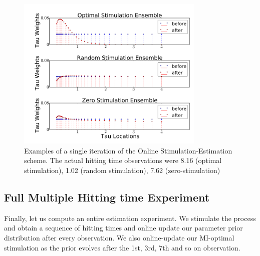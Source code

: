 \documentclass[12pt]{article}
\begin{document}
\begin{figure}[h]
\begin{center}  
\includegraphics[width=0.80\textwidth]
{Figs/HTOnlineEstimator/single_trial_example_weights.pdf} 
\caption[Effect of the First Observation on the Belief
Distribution]{Examples of a single iteration of the Online Stimulation-Estimation scheme.
The actual hitting time observations were 8.16 (optimal stimulation), 1.02
(random stimulation), 7.62 (zero-stimulation) }
\label{fig:example_online_miopt_single_iteration}
\end{center}
\end{figure}  

\subsection{Full Multiple Hitting time Experiment}
Finally, let us compute an entire estimation experiment. We stimulate
the process and obtain a sequence
of hitting times and online update our parameter prior distribution after
every observation. We also online-update our MI-optimal stimulation as
the prior evolves after the 1st, 3rd, 7th and so on observation. 

 
\end{document}
